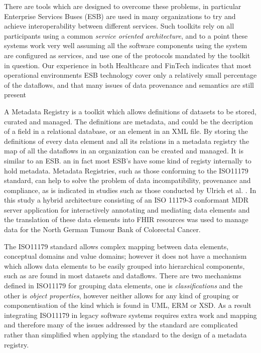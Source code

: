 \documentclass{llncs}
\begin{document}
There are tools which are designed to overcome these problems, in particular Enterprise Services Buses (ESB) are used in many organizations to try and achieve interoperability between different services. Such toolkits rely on all participants using a common \emph{service oriented architecture}, and to a point these systems work very well assuming all the software components using the system are configured as services, and use one of the protocols mandated by the toolkit in question.  Our experience in both Healthcare and FinTech indicates that most operational environments ESB technology cover only a relatively small percentage of the dataflows, and that many issues of data provenance and semantics are still present

A Metadata Registry is a toolkit which allows definitions of datasets to be stored, curated and managed. The definitions are metadata, and could be the decription of a field in a relational database, or an element in an XML file. By storing the definitions of every data element and all its relations in a metadata registry the map of all the dataflows in an organization can be created and managed. It is similar to an ESB. an in fact most ESB's have some kind of registy internally to hold metadata. Metadata Registries, such as those conforming to the ISO11179 standard, can help to solve the problem of data incompatibility, provenance and compliance, as is indicated in studies such as those conducted by Ulrich et al. \cite{MDRHL7} . In this study a hybrid architecture consisting of an ISO 11179-3 conformant MDR server application for interactively annotating and mediating data elements and the translation of these data elements into FHIR resources was used to manage data for the North German Tumour Bank of Colorectal Cancer. 

The ISO11179 standard allows complex mapping between data elements, conceptual domains and value domains; however it does not have a mechanism which allows data elements to be easily grouped into hierarchical components, such as are found in most datasets and dataflows. There are two mechanisms defined in ISO11179 for grouping data elements, one is \emph{classifications} and the other is \emph{object properties}, however neither allows for any kind of grouping or componentisation of the kind which is found in UML, ERM or XSD. As a result integrating ISO11179 in legacy software systems requires extra work and mapping and therefore many of the issues addressed by the standard are complicated rather than simplified when applying the standard to the design of a metadata registry. 
\end{document}
